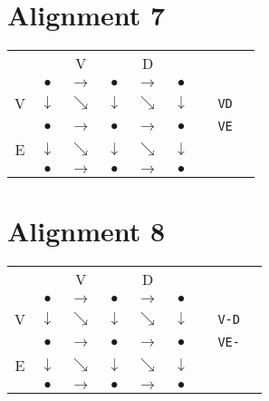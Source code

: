 \documentclass[landscape]{foils}
\begin{document}
\myNewSlide
\section*{Alignment 7}

{
\huge
\begin{center}
\begin{tabular}{cccccccp{1in}c}
   &              & V            &  & D & \\   
   & {\color{red} $\bullet$}      & {\color{black}$\rightarrow$}   & {\color{black} $\bullet$}        &   {\color{black}$\rightarrow$} & {\color{black}$\bullet$} \\
V  & {\color{black} $\downarrow$} & {\color{red}$\searrow$}    & {\color{black} $\downarrow$ } & {\color{black}$\searrow$}    & {\color{black} $\downarrow$ }  & & {\tt VD}\\
   & {\color{black} $\bullet$ }   & {\color{black}$\rightarrow$} & {\color{red} $\bullet$ }   & {\color{black}$\rightarrow$} & {\color{black}  $\bullet$ } & & {\tt VE} \\   
E  & {\color{black} $\downarrow$} & {\color{black}$\searrow$}    & {\color{black} $\downarrow$ } & {\color{red}$\searrow$}    & {\color{black} $\downarrow$ }  \\
   & {\color{black} $\bullet$ }   & {\color{black}$\rightarrow$} & {\color{black} $\bullet$ }   & {\color{black}$\rightarrow$} & {\color{red}  $\bullet$ } \\   
\end{tabular}
\end{center}
}


\myNewSlide
\section*{Alignment 8}

{
\huge
\begin{center}
\begin{tabular}{cccccccp{1in}c}
   &              & V            &  & D & \\   
   & {\color{red} $\bullet$}      & {\color{black}$\rightarrow$}   & {\color{black} $\bullet$}        &   {\color{black}$\rightarrow$} & {\color{black}$\bullet$} \\
V  & {\color{black} $\downarrow$} & {\color{red}$\searrow$}    & {\color{black} $\downarrow$ } & {\color{black}$\searrow$}    & {\color{black} $\downarrow$ }  & & {\tt V-D} \\
   & {\color{black} $\bullet$ }   & {\color{black}$\rightarrow$} & {\color{red} $\bullet$ }   & {\color{black}$\rightarrow$} & {\color{black}  $\bullet$ } & & {\tt VE-} \\   
E  & {\color{black} $\downarrow$} & {\color{black}$\searrow$}    & {\color{red} $\downarrow$ } & {\color{black}$\searrow$}    & {\color{black} $\downarrow$ }  \\
   & {\color{black} $\bullet$ }   & {\color{black}$\rightarrow$} & {\color{red} $\bullet$ }   & {\color{red}$\rightarrow$} & {\color{red}  $\bullet$ } \\   
\end{tabular}
\end{center}
}
\end{document}
